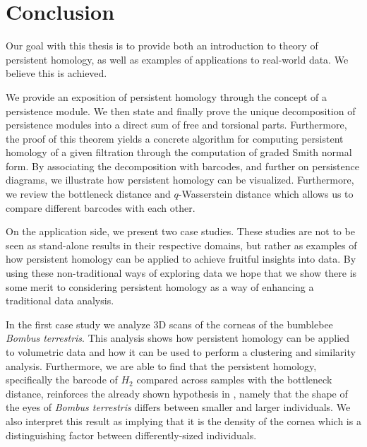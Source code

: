 \clearpage
\chapter{Conclusion}


Our goal with this thesis is to provide both an introduction to theory of persistent homology, as well as examples of applications to real-world data. We believe this is achieved.

We provide an exposition of persistent homology through the concept of a persistence module. We then state and finally prove the unique decomposition of persistence modules into a direct sum of free and torsional parts.  Furthermore, the proof of this theorem yields a concrete algorithm for computing persistent homology of a given filtration through the computation of graded Smith normal form. By associating the decomposition with barcodes, and further on persistence diagrams, we illustrate how persistent homology can be visualized. Furthermore, we review the bottleneck distance and $q$-Wasserstein distance which allows us to compare different barcodes with each other.

On the application side, we present two case studies. These studies are not to be seen as stand-alone results in their respective domains, but rather as examples of how persistent homology can be applied to achieve fruitful insights into data. By using these non-traditional ways of exploring data we hope that we show there is some merit to considering persistent homology as a way of enhancing a traditional data analysis.

In the first case study we analyze 3D scans of the corneas of the bumblebee \textit{Bombus terrestris}. This analysis shows how persistent homology can be applied to volumetric data and how it can be used to perform a clustering and similarity analysis. Furthermore, we are able to find that the persistent homology, specifically the barcode of $H_{2}$ compared across samples with the bottleneck distance, reinforces the already shown hypothesis in \cite{emily}, namely that the shape of the eyes of \textit{Bombus terrestris} differs between smaller and larger individuals. We also interpret this result as implying that it is the density of the cornea which is a distinguishing factor between differently-sized individuals.

